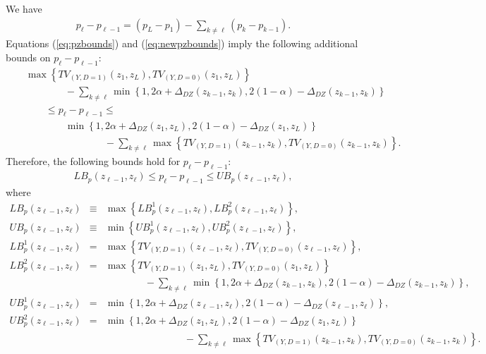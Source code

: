 \documentclass[11pt,reqno]{amsart}
\theoremstyle{plain}
\numberwithin{equation}{section}
\begin{document}
We have
\begin{eqnarray}\label{eq:newpzbounds}
p_\ell-p_{\ell-1}=\left(p_L-p_1\right)-\sum_{k\neq \ell}\left(p_k-p_{k-1}\right).
\end{eqnarray}
Equations (\ref{eq:pzbounds}) and (\ref{eq:newpzbounds}) imply the following additional bounds on $p_\ell-p_{\ell-1}$:
\begin{eqnarray*}
&&\max\left\{TV_{(Y,D=1)}(z_1,z_L), TV_{(Y,D=0)}(z_1,z_L)\right\}\\
&& \qquad \qquad -\sum_{k\neq \ell}\min\left\{1,2\alpha+\Delta_{DZ}(z_{k-1},z_k), 2(1-\alpha)-\Delta_{DZ}(z_{k-1},z_k)\right\}\nonumber\\
 && \qquad \leq p_\ell-p_{\ell-1} \leq\\ 
 && \qquad \qquad \min\left\{1,2\alpha+\Delta_{DZ}(z_1,z_L), 2(1-\alpha)-\Delta_{DZ}(z_1,z_L)\right\} \\
 && \qquad \qquad \qquad \qquad  - \sum_{k\neq \ell}\max\left\{TV_{(Y,D=1)}(z_{k-1},z_k), TV_{(Y,D=0)}(z_{k-1},z_k)\right\}. 
\end{eqnarray*}
Therefore, the following bounds hold for $p_\ell-p_{\ell-1}$: 
\begin{eqnarray*}
LB_p(z_{\ell-1},z_\ell) \leq p_\ell-p_{\ell-1}  \leq UB_p(z_{\ell-1},z_\ell),
\end{eqnarray*}
where
\begin{eqnarray*}
LB_p(z_{\ell-1},z_\ell) &\equiv& \max\left\{LB^1_p(z_{\ell-1},z_\ell),LB^2_p(z_{\ell-1},z_\ell)\right\},\\
UB_p(z_{\ell-1},z_\ell) &\equiv& \min\left\{UB^1_p(z_{\ell-1},z_\ell),UB^2_p(z_{\ell-1},z_\ell)\right\},\\
LB^1_p(z_{\ell-1},z_\ell) &=& \max\left\{TV_{(Y,D=1)}(z_{\ell-1},z_\ell), TV_{(Y,D=0)}(z_{\ell-1},z_\ell)\right\},\\
LB^2_p(z_{\ell-1},z_\ell) &=& \max\left\{TV_{(Y,D=1)}(z_1,z_L), TV_{(Y,D=0)}(z_1,z_L)\right\}\\
&& \qquad \qquad -\sum_{k\neq \ell}\min\left\{1,2\alpha+\Delta_{DZ}(z_{k-1},z_k), 2(1-\alpha)-\Delta_{DZ}(z_{k-1},z_k)\right\},\\ 
UB^1_p(z_{\ell-1},z_\ell) &=& \min\left\{1,2\alpha+\Delta_{DZ}(z_{\ell-1},z_\ell), 2(1-\alpha)-\Delta_{DZ}(z_{\ell-1},z_\ell)\right\},\\
UB^2_p(z_{\ell-1},z_\ell) &=& \min\left\{1,2\alpha+\Delta_{DZ}(z_1,z_L), 2(1-\alpha)-\Delta_{DZ}(z_1,z_L)\right\} \\
 && \qquad \qquad \qquad \qquad  - \sum_{k\neq \ell}\max\left\{TV_{(Y,D=1)}(z_{k-1},z_k), TV_{(Y,D=0)}(z_{k-1},z_k)\right\}.
\end{eqnarray*} 
\end{document}
